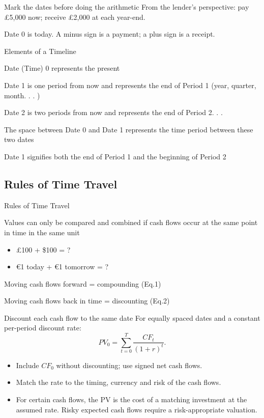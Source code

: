 \documentclass[9pt,aspectratio=169]{beamer}
\newenvironment{wideitemize}{\itemize\addtolength{\itemsep}{10pt}}{\enditemize}
\begin{document}
\begin{frame}{Mark the dates before doing the arithmetic}
From the lender's perspective: pay £5,000 now; receive £2,000 at each year-end.
\begin{center}\end{center}
Date 0 is today. A minus sign is a payment; a plus sign is a receipt.
\end{frame}

\begin{frame}{Elements of a Timeline}
\begin{wideitemize}
\item Date (Time) 0 represents the present
\item Date 1 is one period from now and represents the end of Period 1 (year, quarter, month. . . )
\item Date 2 is two periods from now and represents the end of Period 2. . .
\item The space between Date 0 and Date 1 represents the time period between these two dates
\item Date 1 signifies \alert{both} the end of Period 1 and the beginning of Period 2
\end{wideitemize}
\end{frame}

\subsection{Rules of Time Travel}

\begin{frame}{Rules of Time Travel}
\begin{wideitemize}
\item Values can only be compared and combined if cash flows occur at the same point in time in the same unit
\begin{itemize}
\item £100 + \$100 = ?
\item €1 today + €1 tomorrow = ?
\end{itemize}
\item Moving cash flows forward = compounding (Eq.1)
\item Moving cash flows back in time = discounting (Eq.2)
\end{wideitemize}
\end{frame}

\begin{frame}{Discount each cash flow to the same date}
For equally spaced dates and a constant per-period discount rate:
\[
PV_0=\sum_{t=0}^{T}\frac{CF_t}{(1+r)^t}.
\]
\begin{itemize}
\item Include $CF_0$ without discounting; use signed net cash flows.
\item Match the rate to the timing, currency and risk of the cash flows.
\item For certain cash flows, the PV is the cost of a matching investment at the assumed rate. Risky expected cash flows require a risk-appropriate valuation.
\end{itemize}
\end{frame}
\end{document}
